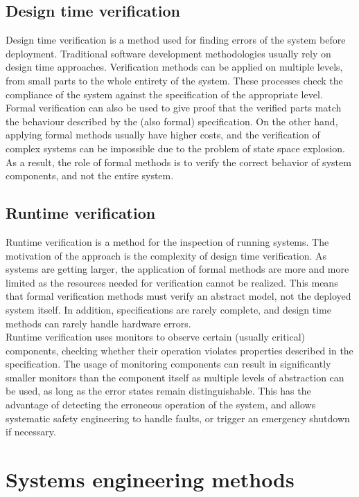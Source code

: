 \subsection{Design time verification}

Design time verification is a method used for finding errors of the system before deployment. Traditional software development methodologies usually rely on design time approaches. Verification methods can be applied on multiple levels, from small parts to the whole entirety of the system. These processes check the compliance of the system against the specification of the appropriate level.\\
Formal verification can also be used to give proof that the verified parts match the behaviour described by the (also formal) specification. On the other hand, applying formal methods usually have higher costs, and the verification of complex systems can be impossible due to the problem of state space explosion. As a result, the role of formal methods is to verify the correct behavior of system components, and not the entire system.

\subsection{Runtime verification}

Runtime verification is a method for the inspection of running systems. The motivation of the approach is the complexity of design time verification. As systems are getting larger, the application of formal methods are more and more limited as the resources needed for verification cannot be realized. This means that formal verification methods must verify an abstract model, not the deployed system itself. In addition, specifications are rarely complete, and design time methods can rarely handle hardware errors.\\
Runtime verification uses monitors to observe certain (usually critical) components, checking whether their operation violates properties described in the specification. The usage of monitoring components can result in significantly smaller monitors than the component itself as multiple levels of abstraction can be used, as long as the error states remain distinguishable. This has the advantage of detecting the erroneous operation of the system, and allows systematic safety engineering to handle faults, or trigger an emergency shutdown if necessary.

\section{Systems engineering methods}

